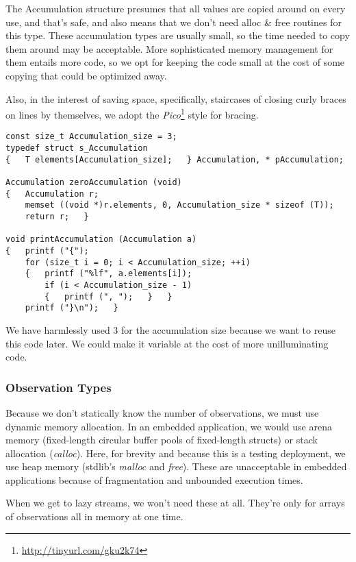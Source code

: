 \documentclass[10pt,oneside,x11names]{article}
\begin{document}
The Accumulation structure presumes that all values are copied around on every
use, and that's safe, and also means that we don't need alloc \& free routines
for this type. These accumulation types are usually small, so the time needed to
copy them around may be acceptable. More sophisticated memory management for
them entails more code, so we opt for keeping the code small at the cost of some
copying that could be optimized away.

Also, in the interest of saving space, specifically, staircases of closing curly
braces on lines by themselves, we adopt the \emph{Pico}\footnote{\url{http://tinyurl.com/gku2k74}} style for bracing. 

\begin{verbatim}
const size_t Accumulation_size = 3;
typedef struct s_Accumulation
{   T elements[Accumulation_size];   } Accumulation, * pAccumulation;

Accumulation zeroAccumulation (void)
{   Accumulation r;
    memset ((void *)r.elements, 0, Accumulation_size * sizeof (T));
    return r;   }

void printAccumulation (Accumulation a)
{   printf ("{");
    for (size_t i = 0; i < Accumulation_size; ++i)
    {   printf ("%lf", a.elements[i]);
        if (i < Accumulation_size - 1)
        {   printf (", ");   }   }
    printf ("}\n");   }
\end{verbatim}

We have harmlessly used \(3\) for the accumulation size because we want to reuse
this code later. We could make it variable at the cost of more unilluminating
code.

\subsubsection{Observation Types}
\label{sec:orgheadline7}

Because we don't statically know the number of observations, we must use
dynamic memory allocation. In an embedded application, we would use arena memory
(fixed-length circular buffer pools of fixed-length structs) or stack allocation
(\emph{calloc}). Here, for brevity and because this is a testing deployment, we use
heap memory (stdlib's \emph{malloc} and \emph{free}). These are unacceptable in embedded
applications because of fragmentation and unbounded execution times. 

When we get to lazy streams, we won't need these at all. They're only for arrays
of observations all in memory at one time.
\end{document}
